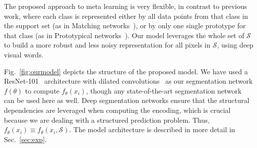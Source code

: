 \documentclass[10pt,twocolumn,letterpaper]{article}
\begin{document}
The proposed approach to meta learning is very flexible, in contrast to previous work, where each class is represented either by all data points from that class in the support set (as in Matching networks~\cite{NIPS2016_6385}), or by only one single prototype for that class (as in Prototypical networks~\cite{NIPS2017_6996}).
Our model leverages the whole set of $\mathcal{S}$ to build a more robust and less noisy representation for all pixels in $\mathcal{S}$, using deep visual words.

Fig.~\ref{fig:ourmodel} depicts the structure of the proposed model. We have used a ResNet-101~\cite{resnet} architecture with dilated convolutions~\cite{deeplab} as our segmentation network $f(\theta)$ to compute $f_\theta(x_i)$, though any state-of-the-art segmentation network can be used here as well. Deep segmentation networks ensure that the structural dependencies are leveraged when computing the encoding, which is crucial because we are dealing with a structured prediction problem. Thus, $f_\theta(x_i) \equiv f_\theta(x_i, \mathcal{S})$.
The model architecture is described in more detail in Sec.~\ref{sec:exp}.
\end{document}

